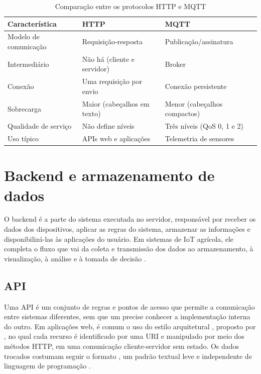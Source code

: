 \begin{table}[htbp]
  \centering
  \caption{Comparação entre os protocolos HTTP e MQTT}
  \label{tab:http-mqtt}
  \small
  \begin{tabular}{p{3.5cm} p{5cm} p{5cm}}
    \hline
    \textbf{Característica} & \textbf{HTTP} & \textbf{MQTT} \\
    \hline
    Modelo de comunicação & Requisição-resposta & Publicação/assinatura \\
    Intermediário & Não há (cliente e servidor) & Broker \\
    Conexão & Uma requisição por envio & Conexão persistente \\
    Sobrecarga & Maior (cabeçalhos em texto) & Menor (cabeçalhos compactos) \\
    Qualidade de serviço & Não define níveis & Três níveis (QoS 0, 1 e 2) \\
    Uso típico & APIs web e aplicações & Telemetria de sensores \\
    \hline
  \end{tabular}
\end{table}

\section{Backend e armazenamento de dados}

O backend é a parte do sistema executada no servidor, responsável por receber os dados dos dispositivos, aplicar as regras do sistema, armazenar as informações e disponibilizá-las às aplicações do usuário. Em sistemas de IoT agrícola, ele completa o fluxo que vai da coleta e transmissão dos dados ao armazenamento, à visualização, à análise e à tomada de decisão \cite{chamara2022}. 

\subsection{API}

Uma API é um conjunto de regras e pontos de acesso que permite a comunicação entre sistemas diferentes, sem que um precise conhecer a implementação interna do outro. Em aplicações web, é comum o uso do estilo arquitetural , proposto por , no qual cada recurso é identificado por uma URI e manipulado por meio dos métodos HTTP, em uma comunicação cliente-servidor sem estado. Os dados trocados costumam seguir o formato , um padrão textual leve e independente de linguagem de programação \cite{rfc8259}.

